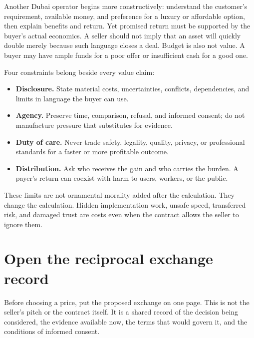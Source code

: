 Another Dubai operator begins more constructively: understand the customer's
requirement, available money, and preference for a luxury or affordable
option, then explain benefits and return. Yet promised return must be supported
by the buyer's actual economics. A seller should not imply that an asset will
quickly double merely because such language closes a deal. Budget is also not
value. A buyer may have ample funds for a poor offer or insufficient cash for a
good one.

Four constraints belong beside every value claim:

\begin{itemize}[leftmargin=1.5em,itemsep=0.15em]
\item \textbf{Disclosure.} State material costs, uncertainties, conflicts,
  dependencies, and limits in language the buyer can use.
\item \textbf{Agency.} Preserve time, comparison, refusal, and informed consent;
  do not manufacture pressure that substitutes for evidence.
\item \textbf{Duty of care.} Never trade safety, legality, quality, privacy, or
  professional standards for a faster or more profitable outcome.
\item \textbf{Distribution.} Ask who receives the gain and who carries the
  burden. A payer's return can coexist with harm to users, workers, or the
  public.
\end{itemize}

These limits are not ornamental morality added after the calculation. They
change the calculation. Hidden implementation work, unsafe speed, transferred
risk, and damaged trust are costs even when the contract allows the seller to
ignore them.

\newpage
\section{Open the reciprocal exchange record}

Before choosing a price, put the proposed exchange on one page. This is not the
seller's pitch or the contract itself. It is a shared record of the decision
being considered, the evidence available now, the terms that would govern it,
and the conditions of informed consent.

